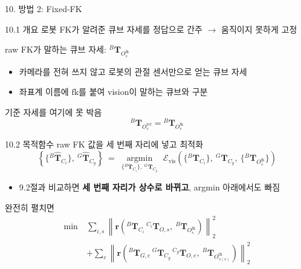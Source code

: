 \documentclass[aspectratio=169,11pt]{beamer}
\newcommand{\T}[3][]{{}^{#2}\mathbf{T}^{#1}_{#3}}   %
\newcommand{\Th}[3][]{{}^{#2}\widehat{\mathbf{T}}^{#1}_{#3}} %
\newcommand{\Oref}{O^{\mathrm{ref}}}   %
\newcommand{\Ofk}{O^{\mathrm{fk}}}     %
\begin{document}
\begin{frame}{10. 방법 2: Fixed-FK}
  \begin{block}{10.1 개요}
    로봇 FK가 알려준 큐브 자세를 정답으로 간주 $\rightarrow$ 움직이지 못하게 고정
  \end{block}
  \vfill
  raw FK가 말하는 큐브 자세: $\T{B}{\Ofk_s}$
  \begin{itemize}
    \item 카메라를 전혀 쓰지 않고 로봇의 관절 센서만으로 얻는 큐브 자세
    \item 좌표계 이름에 $\mathrm{fk}$를 붙여 vision이 말하는 큐브와 구분
  \end{itemize}
  \vfill
  기준 자세를 여기에 못 박음
  \[
    \T{B}{\Oref_s}=\T{B}{\Ofk_s}
  \]
\end{frame}

\begin{frame}{10.2 목적함수}
  raw FK 값을 세 번째 자리에 넣고 최적화
  {\footnotesize
  \[
    \left\{
      \{\Th{B}{C_i}\},\ \Th{G}{C_g}
    \right\}
    \ =\
    \underset{
      \{\T{B}{C_i}\},\ \T{G}{C_g}
    }{\operatorname{argmin}}
    \ \,
    \mathcal{E}_{\mathrm{vis}}
    \left(
      \{\T{B}{C_i}\},\ \T{G}{C_g},\ \{\T{B}{\Ofk_s}\}
    \right)
  \]
  }
  \begin{itemize}
    \item 9.2절과 비교하면 \textbf{세 번째 자리가 상수로 바뀌고},
      argmin 아래에서도 빠짐
  \end{itemize}
  \vfill
  완전히 펼치면
  {\footnotesize
  \[
    \begin{aligned}
      \min\ {}&
      \sum_{i,s}
      \left\|\mathbf{r}\left(
        \T{B}{C_i}\,\T{C_i}{O,s},\ \T{B}{\Ofk_s}
      \right)\right\|_2^2
      \\[4pt]
      &+
      \sum_e
      \left\|\mathbf{r}\left(
        \T{B}{G,e}\,\T{G}{C_g}\,\T{C_g}{O,e},\ \T{B}{\Ofk_{s(e)}}
      \right)\right\|_2^2
    \end{aligned}
  \]
  }
\end{frame}
\end{document}
